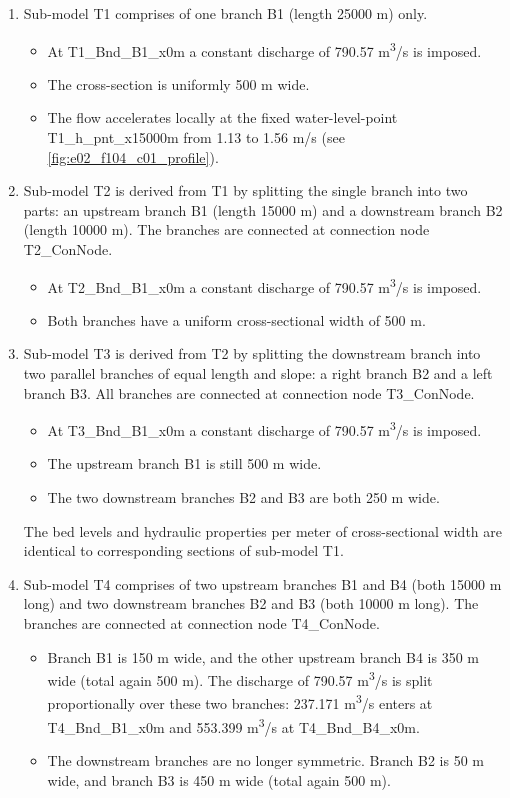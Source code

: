 \begin{enumerate}
	\item Sub-model T1 comprises of one branch B1 (length 25000 m) only.
		\begin{itemize}
			\item At T1\_Bnd\_B1\_x0m a constant discharge of 790.57 m\textsuperscript{3}/s is imposed.
			\item The cross-section is uniformly 500 m wide.
			\item The flow accelerates locally at the fixed water-level-point T1\_h\_pnt\_x15000m from 1.13 to 1.56 m/s (see \autoref{fig:e02_f104_c01_profile}).
		\end{itemize}

	\item Sub-model T2 is derived from T1 by splitting the single branch into two parts: an upstream branch B1 (length 15000 m) and a downstream branch B2 (length 10000 m).
	The branches are connected at connection node T2\_ConNode.
		\begin{itemize}
			\item At T2\_Bnd\_B1\_x0m a constant discharge of 790.57 m\textsuperscript{3}/s is imposed.
			\item Both branches have a uniform cross-sectional width of 500 m.
		\end{itemize}

	\item Sub-model T3 is derived from T2 by splitting the downstream branch into two parallel branches of equal length and slope: a right branch B2 and a left branch B3.
	All branches are connected at connection node T3\_ConNode.
		\begin{itemize}
			\item At T3\_Bnd\_B1\_x0m a constant discharge of 790.57 m\textsuperscript{3}/s is imposed.
			\item The upstream branch B1 is still 500 m wide.
			\item The two downstream branches B2 and B3 are both 250 m wide.
		\end{itemize}

		\Note The bed levels and hydraulic properties per meter of cross-sectional width are identical to corresponding sections of sub-model T1.

	\item Sub-model T4 comprises of two upstream branches B1 and B4 (both 15000 m long) and two downstream branches B2 and B3 (both 10000 m long).
	The branches are connected at connection node T4\_ConNode.
		\begin{itemize}
			\item Branch B1 is 150 m wide, and the other upstream branch B4 is 350 m wide (total again 500 m).
			The discharge of 790.57 m\textsuperscript{3}/s is split proportionally over these two branches: 237.171 m\textsuperscript{3}/s enters at T4\_Bnd\_B1\_x0m and 553.399 m\textsuperscript{3}/s at T4\_Bnd\_B4\_x0m.
			\item The downstream branches are no longer symmetric.
			Branch B2 is 50 m wide, and branch B3 is 450 m wide (total again 500 m).
		\end{itemize}


\end{enumerate}
